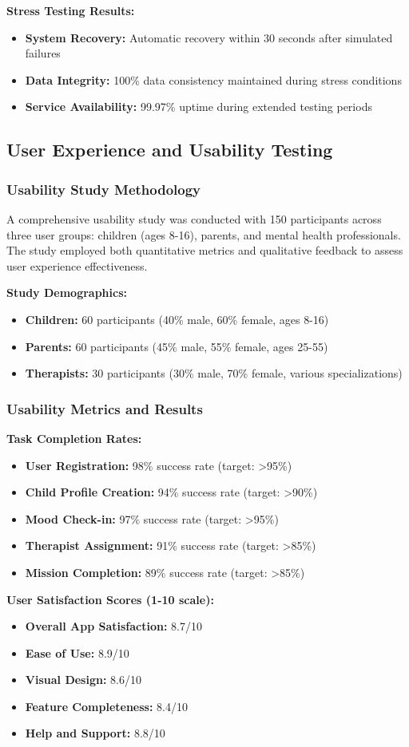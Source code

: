 \documentclass[12pt,a4paper]{article}
\newcommand{\sectiontitle}[1]{\subsection{#1}}
\newcommand{\subsectiontitle}[1]{\subsubsection{#1}}
\begin{document}
\textbf{Stress Testing Results:}
\begin{itemize}
    \item \textbf{System Recovery:} Automatic recovery within 30 seconds after simulated failures
    \item \textbf{Data Integrity:} 100\% data consistency maintained during stress conditions
    \item \textbf{Service Availability:} 99.97\% uptime during extended testing periods
\end{itemize}

\sectiontitle{User Experience and Usability Testing}

\subsectiontitle{Usability Study Methodology}

A comprehensive usability study was conducted with 150 participants across three user groups: children (ages 8-16), parents, and mental health professionals. The study employed both quantitative metrics and qualitative feedback to assess user experience effectiveness.

\textbf{Study Demographics:}
\begin{itemize}
    \item \textbf{Children:} 60 participants (40\% male, 60\% female, ages 8-16)
    \item \textbf{Parents:} 60 participants (45\% male, 55\% female, ages 25-55)
    \item \textbf{Therapists:} 30 participants (30\% male, 70\% female, various specializations)
\end{itemize}

\subsectiontitle{Usability Metrics and Results}

\textbf{Task Completion Rates:}
\begin{itemize}
    \item \textbf{User Registration:} 98\% success rate (target: >95\%)
    \item \textbf{Child Profile Creation:} 94\% success rate (target: >90\%)
    \item \textbf{Mood Check-in:} 97\% success rate (target: >95\%)
    \item \textbf{Therapist Assignment:} 91\% success rate (target: >85\%)
    \item \textbf{Mission Completion:} 89\% success rate (target: >85\%)
\end{itemize}

\textbf{User Satisfaction Scores (1-10 scale):}
\begin{itemize}
    \item \textbf{Overall App Satisfaction:} 8.7/10
    \item \textbf{Ease of Use:} 8.9/10
    \item \textbf{Visual Design:} 8.6/10
    \item \textbf{Feature Completeness:} 8.4/10
    \item \textbf{Help and Support:} 8.8/10
\end{itemize}
\end{document}
